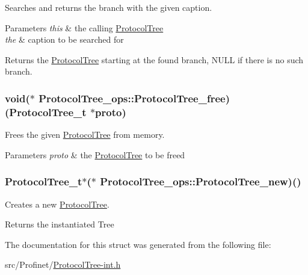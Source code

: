 Searches and returns the branch with the given caption. 


\begin{DoxyParams}{Parameters}
{\em this} & the calling \hyperlink{struct_protocol_tree}{Protocol\-Tree} \\
\hline
{\em the} & caption to be searched for\\
\hline
\end{DoxyParams}
\begin{DoxyReturn}{Returns}
the \hyperlink{struct_protocol_tree}{Protocol\-Tree} starting at the found branch, N\-U\-L\-L if there is no such branch. 
\end{DoxyReturn}
\hypertarget{struct_protocol_tree__ops_a35f233952b5640b3796d35866ac336f4}{
\subsubsection[{Protocol\-Tree\-\_\-free}]{\setlength{\rightskip}{0pt plus 5cm}void($\ast$ Protocol\-Tree\-\_\-ops\-::\-Protocol\-Tree\-\_\-free)(Protocol\-Tree\-\_\-t $\ast$proto)}}\label{struct_protocol_tree__ops_a35f233952b5640b3796d35866ac336f4}


Frees the given \hyperlink{struct_protocol_tree}{Protocol\-Tree} from memory. 


\begin{DoxyParams}{Parameters}
{\em proto} & the \hyperlink{struct_protocol_tree}{Protocol\-Tree} to be freed \\
\hline
\end{DoxyParams}
\hypertarget{struct_protocol_tree__ops_a799c780a3f4a6b1a3b5399b52dec9f3b}{
\subsubsection[{Protocol\-Tree\-\_\-new}]{\setlength{\rightskip}{0pt plus 5cm}Protocol\-Tree\-\_\-t$\ast$($\ast$ Protocol\-Tree\-\_\-ops\-::\-Protocol\-Tree\-\_\-new)()}}\label{struct_protocol_tree__ops_a799c780a3f4a6b1a3b5399b52dec9f3b}


Creates a new \hyperlink{struct_protocol_tree}{Protocol\-Tree}. 

\begin{DoxyReturn}{Returns}
the instantiated Tree 
\end{DoxyReturn}


The documentation for this struct was generated from the following file\-:\begin{DoxyCompactItemize}
\item 
src/\-Profinet/\hyperlink{_protocol_tree-int_8h}{Protocol\-Tree-\/int.\-h}\end{DoxyCompactItemize}
